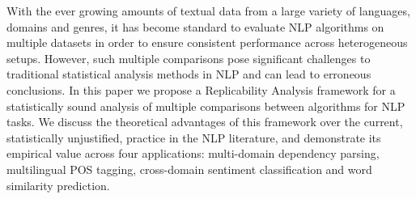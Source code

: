 With the ever growing amounts of textual data from a large variety of languages, domains and genres, it has become standard to evaluate NLP algorithms on multiple datasets in order to ensure consistent performance across heterogeneous setups. However, such multiple comparisons pose significant challenges to traditional statistical analysis methods in NLP and can lead to erroneous conclusions. In this paper we propose a Replicability Analysis framework for a statistically sound analysis of multiple comparisons between algorithms for NLP tasks. We discuss the theoretical advantages of this framework over the current, statistically unjustified, practice in the NLP literature, and demonstrate its empirical value across four applications: multi-domain dependency parsing, multilingual POS tagging, cross-domain sentiment classification and word similarity prediction.
